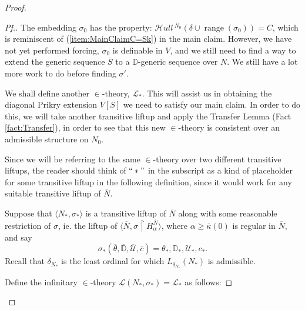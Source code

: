 \documentclass{amsart}
\theoremstyle{definition}
\theoremstyle{remark}
\newcommand{\D}{\mathbb{D}}
\newcommand{\N}{{\overline{N}}}
\renewcommand{\S}{{\overline{S}}}
\newcommand{\U}{\mathcal{U}}
\DeclareMathOperator{\ran}{range}
\newcommand{\rest}{\mathbin{\upharpoonright}}
\newcommand{\SH}{\mathcal{H}\textit{ull} \,}
\newcommand{\sk}[3]{\SH^{#1}( {#2} \cup {\ran(#3)} ) }
\begin{document}
\begin{proof}
\begin{proof}[Pf.]
The embedding $\sigma_0$ has the property: $\sk{N_0}{\delta}{\sigma_0}= C$, which is reminiscent of (\ref{item:MainClaimC=Sk}) in the main claim. 
However, we have not yet performed forcing, $\sigma_0$ is definable in $V$, and we still need to find a way to extend the generic sequence $\S$ to a $\D$-generic sequence over $N$. 
We still have a lot more work to do before finding $\sigma'$.

We shall define another $\in$-theory, $\mathcal L_*$. 
This will assist us in obtaining the diagonal Prikry extension $V[S]$ we need to satisfy our main claim. In order to do this, we will take another transitive liftup and apply the Transfer Lemma (Fact \ref{fact:Transfer}), in order to see that this new $\in$-theory is consistent over an admissible structure on $N_0$. 

Since we will be referring to the same $\in$-theory over two different transitive liftups, the reader should think of $``*"$ in the subscript as a kind of placeholder for some transitive liftup in the following definition, since it would work for any suitable transitive liftup of $\N$.

Suppose that $\langle N_*, \sigma_* \rangle$ is a transitive liftup of $\N$ along with some reasonable restriction of $\sigma$, ie. the liftup of $\langle \N, \sigma \rest H_{\alpha}^{\N} \rangle$, where $\alpha \geq \overline \kappa(0)$ is regular in $\N$, and say $$\sigma_*(\overline \theta, \overline{\D}, \overline{\U}, \overline c) = \theta_*, \D_*, \U_*, c_*.$$ Recall that $\delta_{N_*}$ is the least ordinal for which $L_{\delta_{N_*}}(N_*)$ is admissible. 

Define the infinitary $\in$-theory $\mathcal L(N_*, \sigma_*)=\mathcal L_*$ as follows: 


\end{proof}
\end{proof}
\end{document}
